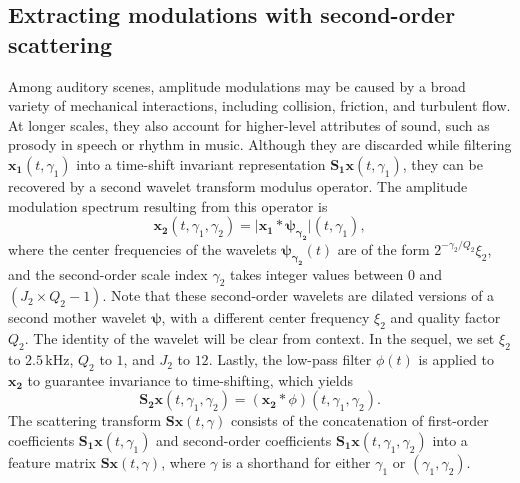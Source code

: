 \documentclass[journal]{IEEEtran}
\begin{document}
\subsection{Extracting modulations with second-order scattering}
Among auditory scenes, amplitude modulations may be caused by a broad variety of mechanical interactions, including collision, friction, and turbulent flow.
At longer scales, they also account for higher-level attributes of sound, such as prosody in speech or rhythm in music.
Although they are discarded while filtering $\boldsymbol{x_1}(t,\gamma_1)$ into a time-shift invariant representation $\mathbf{S_1}\boldsymbol{x}(t,\gamma_1)$, they can be recovered by a second wavelet transform modulus operator.
The amplitude modulation spectrum resulting from this operator is
\begin{equation}
\boldsymbol{x_2}(t,\gamma_1,\gamma_2) =
\vert \boldsymbol{x_1} \ast \boldsymbol{\psi_{\gamma_2}} \vert(t,\gamma_1),
\end{equation}
where the center frequencies of the wavelets $\boldsymbol{\psi_{\gamma_2}}(t)$ are of the form $2^{-\gamma_2/Q_2} \xi_2$, and the second-order scale index $\gamma_2$ takes integer values between $0$ and $(J_2 \times Q_2 - 1)$. Note that these second-order wavelets are dilated versions of a second mother wavelet $\boldsymbol{\psi}$, with a different center frequency $\xi_2$ and quality factor $Q_2$. The identity of the wavelet will be clear from context.
In the sequel, we set $\xi_2$ to $2.5\,\mathrm{kHz}$, $Q_2$ to $1$, and $J_2$ to $12$. Lastly, the low-pass filter $\phi(t)$ is applied to $\boldsymbol{x_2}$ to guarantee invariance to time-shifting, which yields
\begin{equation}
\mathbf{S_2}\boldsymbol{x}(t,\gamma_1,\gamma_2) =
(\boldsymbol{x_2} \ast \phi)(t,\gamma_1,\gamma_2).
\end{equation}
The scattering transform $\mathbf{S}\boldsymbol{x}(t,\gamma)$ consists of the concatenation of first-order coefficients $\mathbf{S_1}\boldsymbol{x}(t,\gamma_1)$ and second-order coefficients $\mathbf{S_1}\boldsymbol{x}(t,\gamma_1,\gamma_2)$ into a feature matrix $\mathbf{S}\boldsymbol{x}(t,\gamma)$, where $\gamma$ is a shorthand for either $\gamma_1$ or $(\gamma_1,\gamma_2)$.
\end{document}
